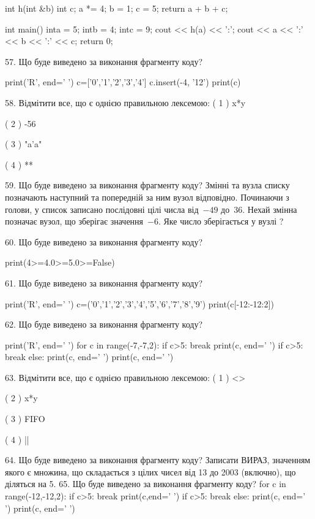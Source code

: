 \documentclass[11pt]{article}
\begin{document}
int h(int &b){
int c;    a *= 4;
    b = 1;
    c = 5;
    return a + b + c;
}

int main(){
    inta = 5;
    intb = 4;
    intc = 9;
    cout << h(a) << ':';
    cout << a << ':' << b << ':' << c;
    return 0; 
}

57. Що буде виведено за виконання фрагменту коду?

print('R', end=' ')
c=['0','1','2','3','4']
c.insert(-4, '12')
print(c)


58. %
Відмітити все, що є однією правильною лексемою:
( 1 ) x*y

( 2 ) -56

( 3 ) "a'a"

( 4 ) **

59. Що буде виведено за виконання фрагменту коду?
Змінні  та  вузла списку позначають наступний та попередній за ним вузол відповідно. Починаючи з голови, у список записано послідовні цілі числа від~$-49$ до~$36$. Нехай змінна  позначає вузол, що зберігає значення~$-6$.
Яке число зберігається у вузлі  ?

60. Що буде виведено за виконання фрагменту коду?

print(4>=4.0>=5.0>=False)

61. Що буде виведено за виконання фрагменту коду?

print('R', end=' ')
c=('0','1','2','3','4','5','6','7','8','9')
print(c[-12:-12:2])


62. Що буде виведено за виконання фрагменту коду?

print('R', end=' ')
for c in range(-7,-7,2):
    if c>5:
        break
        print(c, end=' ')
    if c>5:
        break
    else:
        print(c, end=' ')
    print(c, end=' ')

63. %
Відмітити все, що є однією правильною лексемою:
( 1 ) <>

( 2 ) x*y

( 3 ) FIFO

( 4 ) ||

64. Що буде виведено за виконання фрагменту коду?
Записати ВИРАЗ, значенням якого є множина, що складається з цілих чисел від 13 до 2003 (включно), що діляться на 5.
65. Що буде виведено за виконання фрагменту коду?
for c in range(-12,-12,2):
    if c>5:
        break
        print(c,end=' ')
    if c>5:
        break
else:
    print(c, end=' ')
print(c, end=' ')
\end{document}
